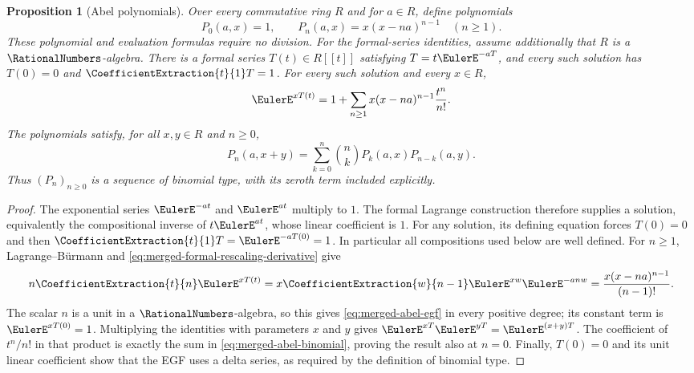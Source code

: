 \documentclass[11pt,a4paper,oneside,openany]{book}
\newtheorem{proposition}[theorem]{Proposition}
\theoremstyle{definition}
\theoremstyle{remark}
\begin{document}
\begin{proposition}[Abel polynomials]
\label{prop:merged-abel}
Over every commutative ring $R$ and for $a\in R$, define polynomials
\[
 P_0(a,x)=1,\qquad P_n(a,x)=x(x-na)^{n-1}\quad(n\geq1).
\]
These polynomial and evaluation formulas require no division.
For the formal-series identities, assume additionally that $R$ is a
$\RationalNumbers$-algebra.  There is a formal series $T(t)\in R[[t]]$
satisfying $T=t\EulerE^{-aT}$, and every such solution has
$T(0)=0$ and $\CoefficientExtraction{t}{1}T=1$.
For every such solution and every $x\in R$,
\begin{equation}
 \EulerE^{xT(t)}=1+\sum_{n\geq1}x(x-na)^{n-1}\frac{t^n}{n!}.              \label{eq:merged-abel-egf}
\end{equation}
The polynomials satisfy, for all $x,y\in R$ and $n\geq0$,
\begin{equation}
 P_n(a,x+y)=\sum_{k=0}^n\binom nk P_k(a,x)P_{n-k}(a,y).
 \label{eq:merged-abel-binomial}
\end{equation}
Thus $(P_n)_{n\geq0}$ is a sequence of binomial type, with its zeroth
term included explicitly.
\end{proposition}

\begin{proof}
The exponential series $\EulerE^{-at}$ and $\EulerE^{at}$ multiply to $1$.
The formal Lagrange construction therefore supplies a solution, equivalently
the compositional inverse of $t\EulerE^{at}$, whose linear coefficient is $1$.
For any solution, its defining equation forces $T(0)=0$ and then
$\CoefficientExtraction{t}{1}T=\EulerE^{-aT(0)}=1$.
In particular all compositions used below are well defined.
For $n\geq1$, Lagrange--Bürmann and
\cref{eq:merged-formal-rescaling-derivative} give
\[
 n\CoefficientExtraction{t}{n}\EulerE^{xT(t)}
 =x\CoefficientExtraction{w}{n-1}\EulerE^{xw}\EulerE^{-anw}
 =\frac{x(x-na)^{n-1}}{(n-1)!}.
\]
The scalar $n$ is a unit in a $\RationalNumbers$-algebra, so this gives
\cref{eq:merged-abel-egf} in every positive degree; its constant term is
$\EulerE^{xT(0)}=1$.  Multiplying the identities with parameters $x$ and
$y$ gives $\EulerE^{xT}\EulerE^{yT}=\EulerE^{(x+y)T}$.
The coefficient of $t^n/n!$ in that product is exactly the sum in
\cref{eq:merged-abel-binomial}, proving the result also at $n=0$.
Finally, $T(0)=0$ and its unit linear coefficient show that the EGF uses
a delta series, as required by the definition of binomial type.
\end{proof}
\end{document}

